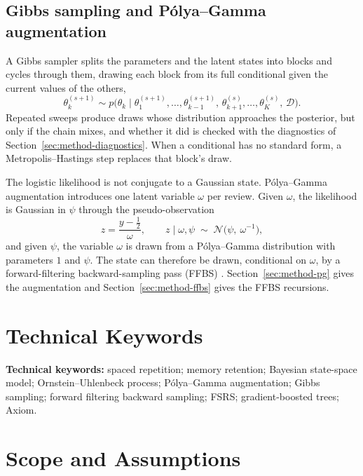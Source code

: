 \subsection{Gibbs sampling and P\'olya--Gamma augmentation}
\label{sec:intro-math-gibbs}

A Gibbs sampler splits the parameters and the latent states into blocks and cycles through them, drawing each block from its full conditional given the current values of the others,
\begin{equation}
  \theta_k^{(s+1)} \sim p\bigl(\theta_k \mid \theta_1^{(s+1)},\dots,\theta_{k-1}^{(s+1)},\,\theta_{k+1}^{(s)},\dots,\theta_K^{(s)},\,\mathcal{D}\bigr).
  \label{eq:intro-gibbs}
\end{equation}
Repeated sweeps produce draws whose distribution approaches the posterior, but only if the chain mixes, and whether it did is checked with the diagnostics of Section~\ref{sec:method-diagnostics}. When a conditional has no standard form, a Metropolis--Hastings step replaces that block's draw.

The logistic likelihood is not conjugate to a Gaussian state. P\'olya--Gamma augmentation \cite{polson2013pg} introduces one latent variable $\omega$ per review. Given $\omega$, the likelihood is Gaussian in $\psi$ through the pseudo-observation
\begin{equation}
  z = \frac{y-\tfrac{1}{2}}{\omega}, \qquad z \mid \omega, \psi \;\sim\; \mathcal{N}\!\bigl(\psi,\ \omega^{-1}\bigr),
  \label{eq:intro-pg}
\end{equation}
and given $\psi$, the variable $\omega$ is drawn from a P\'olya--Gamma distribution with parameters $1$ and $\psi$. The state can therefore be drawn, conditional on $\omega$, by a forward-filtering backward-sampling pass (FFBS) \cite{carter1994gibbs,fruhwirth1994data}. Section~\ref{sec:method-pg} gives the augmentation and Section~\ref{sec:method-ffbs} gives the FFBS recursions.

\section{Technical Keywords}
\label{sec:intro-keywords}

\textbf{Technical keywords:} spaced repetition; memory retention; Bayesian state-space model; Ornstein--Uhlenbeck process; P\'olya--Gamma augmentation; Gibbs sampling; forward filtering backward sampling; FSRS; gradient-boosted trees; Axiom.

\section{Scope and Assumptions}
\label{sec:intro-scope}


